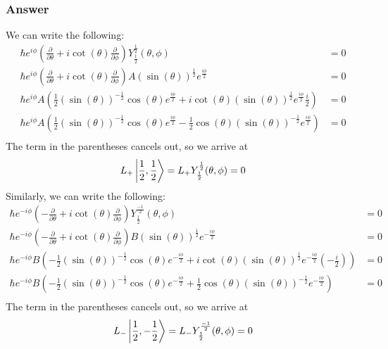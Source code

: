 \documentclass[12pt]{article}
\begin{document}
\subsubsection{Answer}
We can write the following:
\begin{align*}
    \hbar e^{i\phi}(\frac{\partial}{\partial \theta} + i\cot(\theta)\frac{\partial}{\partial \phi})Y_{\frac{1}{2}}^{\frac{1}{2}}(\theta,\phi) &= 0\\
    \hbar e^{i\phi}(\frac{\partial}{\partial \theta} + i\cot(\theta)\frac{\partial}{\partial \phi})A (\sin(\theta))^{\frac{1}{2}}e^{\frac{i\phi}{2}} &= 0\\
    \hbar e^{i\phi}A (\frac{1}{2}(\sin(\theta))^{-\frac{1}{2}}\cos(\theta)e^{\frac{i\phi}{2}} + i\cot(\theta)(\sin(\theta))^{\frac{1}{2}}e^{\frac{i\phi}{2}}\frac{i}{2}) &= 0\\
    \hbar e^{i\phi}A (\frac{1}{2}(\sin(\theta))^{-\frac{1}{2}}\cos(\theta)e^{\frac{i\phi}{2}} - \frac{1}{2}\cos(\theta )( \sin(\theta))^{-\frac{1}{2}}e^{\frac{i\phi}{2}}) &= 0\\
\end{align*}
The term in the parentheses cancels out, so we arrive at
\begin{equation}
    L_+ \ket{\frac{1}{2},\frac{1}{2}} = L_+ Y_{\frac{1}{2}}^{\frac{1}{2}}(\theta,\phi) = 0
\end{equation}
Similarly, we can write the following:
\begin{align*}
    \hbar e^{-i\phi}(-\frac{\partial}{\partial \theta} + i\cot(\theta)\frac{\partial}{\partial \phi})Y_{\frac{1}{2}}^{\frac{-1}{2}}(\theta,\phi) &= 0\\
    \hbar e^{-i\phi}(-\frac{\partial}{\partial \theta} + i\cot(\theta)\frac{\partial}{\partial \phi})B (\sin(\theta))^{\frac{1}{2}}e^{-\frac{i\phi}{2}} &= 0\\
    \hbar e^{-i\phi}B (-\frac{1}{2}(\sin(\theta))^{-\frac{1}{2}}\cos(\theta)e^{-\frac{i\phi}{2}} + i\cot(\theta)(\sin(\theta))^{\frac{1}{2}}e^{-\frac{i\phi}{2}}(-\frac{i}{2})) &= 0\\
    \hbar e^{-i\phi}B (-\frac{1}{2}(\sin(\theta))^{-\frac{1}{2}}\cos(\theta)e^{-\frac{i\phi}{2}} + \frac{1}{2}\cos(\theta )(\sin(\theta))^{-\frac{1}{2}}e^{-\frac{i\phi}{2}}) &= 0\\
\end{align*}
The term in the parentheses cancels out, so we arrive at
\begin{equation}
    L_- \ket{\frac{1}{2},-\frac{1}{2}} = L_- Y_{\frac{1}{2}}^{\frac{-1}{2}}(\theta,\phi) = 0
\end{equation}
\end{document}
